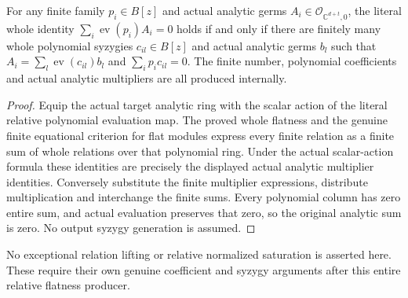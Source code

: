 \begin{corollary}
\label{hir:actual-relative-polynomial-analytic-relations}
\leanok
For any finite family $p_i\in B[z]$ and actual analytic germs
$A_i\in\mathcal O_{\mathbb C^{d+t},0}$, the literal whole identity
$\sum_i\operatorname{ev}(p_i)A_i=0$ holds if and only if there are
finitely many whole polynomial syzygies $c_{il}\in B[z]$ and actual
analytic germs $b_l$ such that
$A_i=\sum_l\operatorname{ev}(c_{il})b_l$ and
$\sum_i p_ic_{il}=0$. The finite number, polynomial coefficients
and actual analytic multipliers are all produced internally.
\end{corollary}
\begin{proof}
Equip the actual target analytic ring with the scalar action of the
literal relative polynomial evaluation map. The proved whole flatness
and the genuine finite equational criterion for flat modules express
every finite relation as a finite sum of whole relations over that
polynomial ring. Under the actual scalar-action formula these identities
are precisely the displayed actual analytic multiplier identities.
Conversely substitute the finite multiplier expressions, distribute
multiplication and interchange the finite sums. Every polynomial column
has zero entire sum, and actual evaluation preserves that zero, so the
original analytic sum is zero. No output syzygy generation is assumed.
\end{proof}

No exceptional relation lifting or relative normalized saturation is
asserted here. These require their own genuine coefficient and syzygy
arguments after this entire relative flatness producer.

